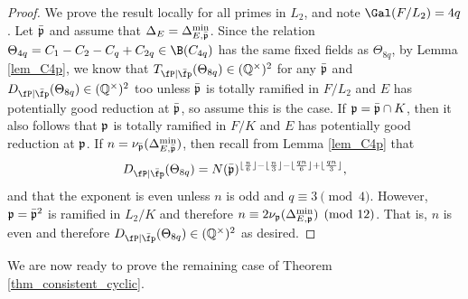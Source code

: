 \begin{proof}
    We prove the result locally for all primes in $L_2$, and note $\Gal(F/L_2)=4q$. Let $\bar{\mathfrak{p}}$ and assume that $\Delta_E=\Delta_{E,\bar{\mathfrak{p}}}^{\min}$. Since the relation $\Theta_{4q}=C_1-C_2-C_q+C_{2q}\in \B(C_{4q})$ has the same fixed fields as $\Theta_{8q}$, by Lemma \ref{lem_C4p}, we know that $\Tpb(\Theta_{8q})\in\QQss$ for any $\bar{\mathfrak{p}}$ and $\Dpb(\Theta_{8q})\in\QQss$ too unless $\bar{\mathfrak{p}}$ is totally ramified in $F/L_2$ and $E$ has potentially good reduction at $\bar{\mathfrak{p}}$, so assume this is the case. If $\mathfrak{p}=\bar{\mathfrak{p}}\cap K$, then it also follows that $\mathfrak{p}$ is totally ramified in $F/K$ and $E$ has potentially good reduction at $\mathfrak{p}$. If $n=\nu_{\bar{\mathfrak{p}}}(\Delta_{E,\bar{\mathfrak{p}}}^{\min})$, then recall from Lemma \ref{lem_C4p} that 
    $$\Dpb(\Theta_{8q})=N(\bar\pp)^{\floor{\frac{n}{6}}-\floor{\frac{n}{3}}-\floor{\frac{qn}{6}}+\floor{\frac{qn}{3}}},$$
    and that the exponent is even unless $n$ is odd and $q\equiv 3\pmod{4}$. However, $\mathfrak{p}=\bar{\mathfrak{p}}^2$ is ramified in $L_2/K$ and therefore $n\equiv 2\nu_{\mathfrak{p}}(\Delta_{E,\mathfrak{p}}^{\min})\pmod{12}$. That is, $n$ is even and therefore $\Dpb(\Theta_{8q})\in\QQss$ as desired.
\end{proof}


We are now ready to prove the remaining case of Theorem \ref{thm_consistent_cyclic}.

